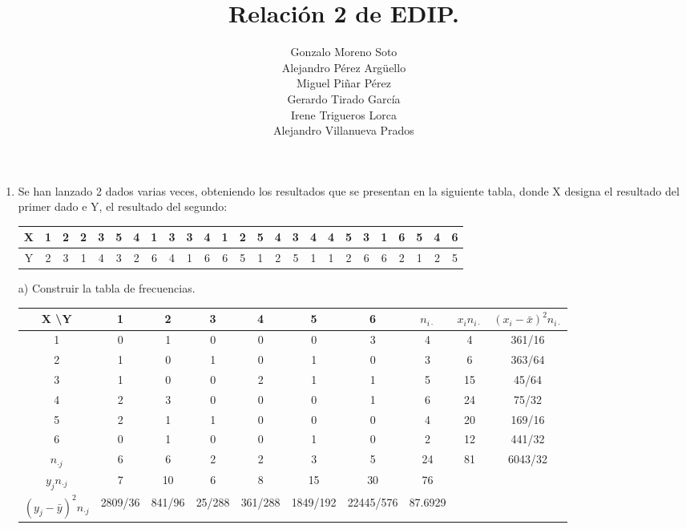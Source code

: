 \documentclass[10pt,a4paper]{article}
\author{Gonzalo Moreno Soto\\ Alejandro Pérez Argüello\\ Miguel Piñar Pérez\\ Gerardo Tirado García\\ Irene Trigueros Lorca\\ Alejandro Villanueva Prados}
\title{Relación 2 de EDIP.}
\begin{document}
\maketitle

\begin{enumerate}
\item Se han lanzado 2 dados varias veces, obteniendo los resultados que se presentan en la siguiente tabla, donde X designa el resultado del primer dado e Y, el resultado del segundo:

\vspace{0.5cm}
\begin{tabular}{|c|c|c|c|c|c|c|c|c|c|c|c|c|c|c|c|c|c|c|c|c|c|c|c|c|}
\hline 
X & 1 & 2 & 2 & 3 & 5 & 4 & 1 & 3 & 3 & 4 & 1 & 2 & 5 & 4 & 3 & 4 & 4 & 5 & 3 & 1 & 6 & 5 & 4 & 6 \\ 
\hline 
Y & 2 & 3 & 1 & 4 & 3 & 2 & 6 & 4 & 1 & 6 & 6 & 5 & 1 & 2 & 5 & 1 & 1 & 2 & 6 & 6 & 2 & 1 & 2 & 5 \\ 
\hline 
\end{tabular} 

\vspace{0.5cm}
\hspace{0.25cm} a) Construir la tabla de frecuencias.

\vspace{0.5cm}
\begin{tabular}{|c|c|c|c|c|c|c|c|c|c|}
\hline 
X  \textbackslash  Y & 1 & 2 & 3 & 4 & 5 & 6 & $n_{i\cdot}$ & $x_in_{i\cdot}$ & $(x_i- \bar{x})^2n_{i\cdot}$ \\ 
\hline 
1 & 0 & 1 & 0 & 0 & 0 & 3 & 4 & 4 & 361/16 \\ 
\hline 
2 & 1 & 0 & 1 & 0 & 1 & 0 & 3 & 6 & 363/64 \\ 
\hline 
3 & 1 & 0 & 0 & 2 & 1 & 1 & 5 & 15 & 45/64 \\ 
\hline 
4 & 2 & 3 & 0 & 0 & 0 & 1 & 6 & 24 & 75/32 \\ 
\hline 
5 & 2 & 1 & 1 & 0 & 0 & 0 & 4 & 20 & 169/16 \\ 
\hline 
6 & 0 & 1 & 0 & 0 & 1 & 0 & 2 & 12 & 441/32 \\ 
\hline 
$n_{\cdot j}$ & 6 & 6 & 2 & 2 & 3 & 5 & 24 & 81 & 6043/32 \\ 
\hline 
$y_jn_{\cdot j}$ & 7 & 10 & 6 & 8 & 15 & 30 & 76 &  &  \\ 
\hline 
$(y_j-\bar{y})^2n_{\cdot j}$ & 2809/36 & 841/96 & 25/288 & 361/288 & 1849/192 & 22445/576 & 87.6929  &   &   \\ 
\hline 
\end{tabular} 


\end{enumerate}
\end{document}
